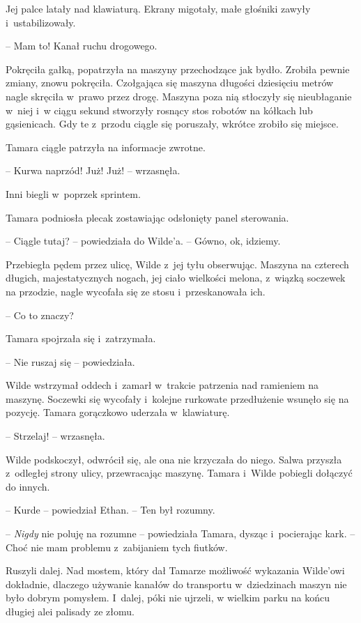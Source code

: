\documentclass[oneside,polish,11pt,sfheadings]{mwbk}
\begin{document}
Jej palce latały nad klawiaturą. Ekrany migotały, małe głośniki zawyły i~ustabilizowały.

-- Mam to! Kanał ruchu drogowego.

Pokręciła gałką, popatrzyła na maszyny przechodzące jak bydło. Zrobiła
pewnie zmiany, znowu pokręciła. Czołgająca się maszyna długości
dziesięciu metrów nagle skręciła w~prawo przez drogę. Maszyna poza nią
stłoczyły się nieubłaganie w~niej i~w ciągu sekund stworzyły rosnący
stos robotów na kółkach lub gąsienicach. Gdy te z~przodu ciągle się
poruszały, wkrótce zrobiło się miejsce.

Tamara ciągle patrzyła na informacje zwrotne.

-- Kurwa naprzód! Już! Już! -- wrzasnęła.

Inni biegli w~poprzek sprintem.

Tamara podniosła plecak zostawiając odsłonięty panel sterowania.

-- Ciągle tutaj? -- powiedziała do Wilde'a. -- Gówno, ok, idziemy.

Przebiegła pędem przez ulicę, Wilde z~jej tyłu obserwując. Maszyna na
czterech długich, majestatycznych nogach, jej ciało wielkości melona, z~wiązką soczewek na przodzie, nagle wycofała się ze stosu i~przeskanowała
ich.

-- Co to znaczy?

Tamara spojrzała się i~zatrzymała.

-- Nie ruszaj się -- powiedziała.

Wilde wstrzymał oddech i~zamarł w~trakcie patrzenia nad ramieniem na
maszynę. Soczewki się wycofały i~kolejne rurkowate przedłużenie wsunęło
się na pozycję. Tamara gorączkowo uderzała w~klawiaturę.

-- Strzelaj! -- wrzasnęła.

Wilde podskoczył, odwrócił się, ale ona nie krzyczała do niego. Salwa
przyszła z~odległej strony ulicy, przewracając maszynę. Tamara i~Wilde
pobiegli dołączyć do innych.

-- Kurde -- powiedział Ethan. -- Ten był rozumny.

-- \emph{Nigdy }nie poluję na rozumne -- powiedziała Tamara, dysząc i~pocierając kark. -- Choć nie mam problemu z~zabijaniem tych fiutków.

Ruszyli dalej. Nad mostem, który dał Tamarze możliwość wykazania
Wilde'owi dokładnie, dlaczego używanie kanałów do transportu w~dziedzinach maszyn nie było dobrym pomysłem. I~dalej, póki nie ujrzeli,
w wielkim parku na końcu długiej alei palisady ze złomu.
\end{document}
